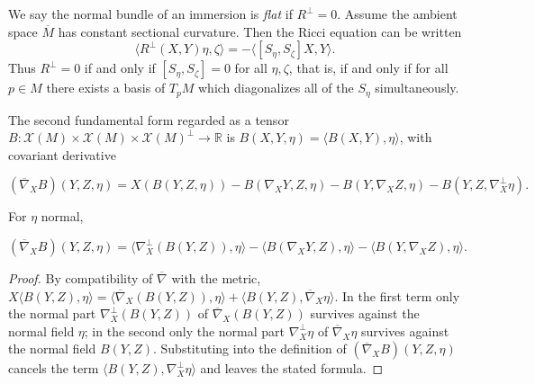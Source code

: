 \begin{remark}
  \label{rem:dc-ch6-3-3}


  We say the normal bundle of an immersion is \emph{flat} if $R^\perp=0$. Assume the
  ambient space $\overline{M}$ has constant sectional curvature. Then the Ricci
  equation can be written
  $$
  \langle R^\perp(X,Y)\eta,\zeta\rangle=-\langle[S_\eta,S_\zeta]X,Y\rangle.
  $$
  Thus $R^\perp=0$ if and only if $[S_\eta,S_\zeta]=0$ for all
  $\eta,\zeta$, that is, if and only if for all $p\in M$ there exists a basis of
  $T_pM$ which diagonalizes all of the $S_\eta$ simultaneously.
\end{remark}

\begin{definition}
  \label{def:dc-ch6-3-covderiv-B}


  The second fundamental form regarded as a tensor
  $B:\mathcal{X}(M)\times\mathcal{X}(M)\times\mathcal{X}(M)^\perp\to\mathbb{R}$
  is $B(X,Y,\eta)=\langle B(X,Y),\eta\rangle$, with covariant derivative

  $$
  (\overline{\nabla}_X B)(Y,Z,\eta)=X(B(Y,Z,\eta))-B(\nabla_X Y,Z,\eta)-B(Y,\nabla_X Z,\eta)-B(Y,Z,\nabla_X^\perp\eta).
  $$
\end{definition}

\begin{lemma}
  \label{lem:dc-ch6-3-covderiv-reduce}


  For $\eta$ normal,

  $$
  (\overline{\nabla}_X B)(Y,Z,\eta)=\langle\nabla_X^\perp(B(Y,Z)),\eta\rangle-\langle B(\nabla_X Y,Z),\eta\rangle-\langle B(Y,\nabla_X Z),\eta\rangle.
  $$
\end{lemma}
\begin{proof}

  \sketch
  By compatibility of $\overline{\nabla}$ with the metric,
  $X\langle B(Y,Z),\eta\rangle
  =\langle\overline{\nabla}_X(B(Y,Z)),\eta\rangle
  +\langle B(Y,Z),\overline{\nabla}_X\eta\rangle$. In the first term only the
  normal part $\nabla^\perp_X(B(Y,Z))$ of $\overline{\nabla}_X(B(Y,Z))$
  survives against the normal field $\eta$; in the second only the normal part
  $\nabla^\perp_X\eta$ of $\overline{\nabla}_X\eta$ survives against the normal
  field $B(Y,Z)$. Substituting into the definition of
  $(\overline{\nabla}_X B)(Y,Z,\eta)$ cancels the term
  $\langle B(Y,Z),\nabla^\perp_X\eta\rangle$ and leaves the stated formula.
\end{proof}


